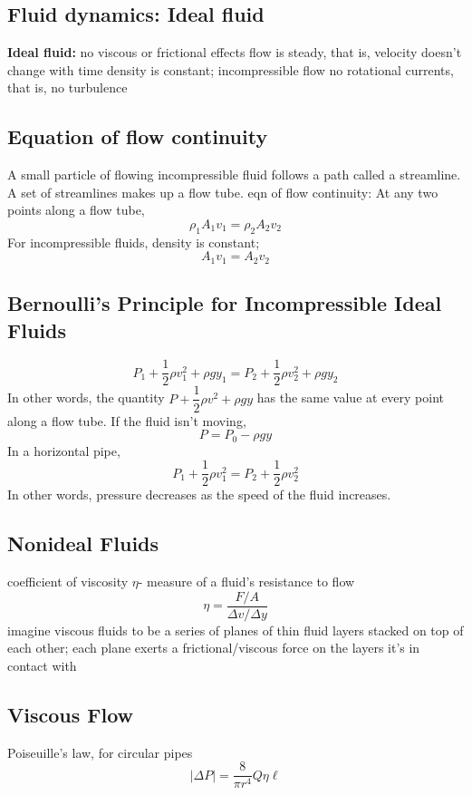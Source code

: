 \documentclass{article}
\begin{document}
\subsection{Fluid dynamics: Ideal fluid}
\begin{outline}
    \1 \textbf{Ideal fluid:}
        \2 no viscous or frictional effects
        \2 flow is steady, that is, velocity doesn't change with time
        \2 density is constant; incompressible flow
        \2 no rotational currents, that is, no turbulence
\end{outline}
\subsection{Equation of flow continuity}
\begin{outline}
    \1 A small particle of flowing incompressible fluid follows a path called a streamline. A set of streamlines makes up a flow tube.
    \1 eqn of flow continuity:
    \1 At any two points along a flow tube, \[\rho_1A_1v_1=\rho_2A_2v_2\]
    \1 For incompressible fluids, density is constant; \[A_1v_1=A_2v_2\]
\end{outline}
\subsection{Bernoulli's Principle for Incompressible Ideal Fluids}
\begin{outline}
\0 \[P_1+\dfrac{1}{2}\rho v^2_1+\rho gy_1=P_2 +\dfrac{1}{2}\rho v^2_2+\rho gy_2\]
    \1 In other words, the quantity \(P+\dfrac{1}{2}\rho v^2+\rho gy\) has the same value at every point along a flow tube. 
    \1 If the fluid isn't moving, \[P=P_0-\rho gy\]
    \1 In a horizontal pipe, \[P_1+\dfrac{1}{2}\rho v^2_1=P_2 +\dfrac{1}{2}\rho v^2_2\]
    \1 In other words, pressure decreases as the speed of the fluid increases. 
\end{outline}
\subsection{Nonideal Fluids}
\begin{outline}
    \1 coefficient of viscosity $\eta$- measure of a fluid's resistance to flow
\0 \[\eta=\dfrac{F/A}{\Delta v/\Delta y}\]
    \1 imagine viscous fluids to be a series of planes of thin fluid layers stacked on top of each other; each plane exerts a frictional/viscous force on the layers it's in contact with
\end{outline}
\subsection{Viscous Flow}
\begin{outline}
    \1 Poiseuille's law, for circular pipes \[|\Delta P|=\dfrac{8}{\pi r^4}Q\eta\ell\]
\end{outline}
\end{document}
